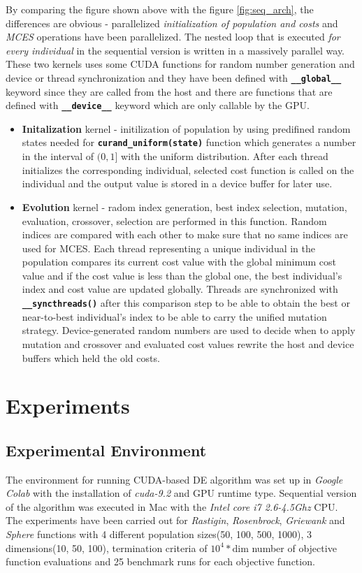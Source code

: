 \documentclass[conference]{IEEEtran}
\begin{document}
By comparing the figure shown above with the figure \ref{fig:seq_arch}, the differences are obvious - parallelized \textit{initialization of population and costs} and \textit{MCES} operations 
have been parallelized. The nested loop that is executed \textit{for every individual} in the sequential version is written in a massively parallel way. These two kernels uses some CUDA 
functions for random number generation and device or thread synchronization and they have been defined with \textbf{\lstinline{__global__}} keyword since they are called from the host and 
there are functions that are defined with \textbf{\lstinline{__device__}} keyword which are only callable by the GPU.

\begin{itemize}
	\item \textbf{Initalization} kernel - initilization of population by using predifined random states needed for \textbf{\lstinline{curand_uniform(state)}} function which generates a number in the 
		interval of $(0, 1]$ with the uniform distribution. After each thread initializes the corresponding individual, selected cost function is called on the individual and the output value is 
		stored in a device buffer for later use.
	\item \textbf{Evolution} kernel - radom index generation, best index selection, mutation, evaluation, crossover, selection are performed in this function. Random indices are compared with each other 
		to make sure that no same indices are used for MCES. Each thread representing a unique individual in the population compares its current cost value with the global minimum cost value and if the 
		cost value is less than the global one, the best individual's index and cost value are updated globally. Threads are synchronized with \textbf{\lstinline{__syncthreads()}} after this comparison 
		step to be able to obtain the best or near-to-best individual's index to be able to carry the unified mutation strategy. Device-generated random numbers are used to decide when to apply mutation 
		and crossover and evaluated cost values rewrite the host and device buffers which held the old costs.
\end{itemize}

\section{Experiments}
\subsection{Experimental Environment}
The environment for running CUDA-based DE algorithm was set up in \textit{Google Colab} with the installation of \textit{cuda-9.2} and GPU runtime type. Sequential version of the algorithm was executed in 
Mac with the \textit{Intel core i7 2.6-4.5Ghz} CPU. The experiments have been carried out for \textit{Rastigin}, \textit{Rosenbrock}, \textit{Griewank} and \textit{Sphere} functions with 
4 different population sizes(50, 100, 500, 1000), 3 dimensions(10, 50, 100), termination criteria of $10^4 * \text{dim}$ number of objective function evaluations and 25 benchmark runs for each objective function.
\end{document}
